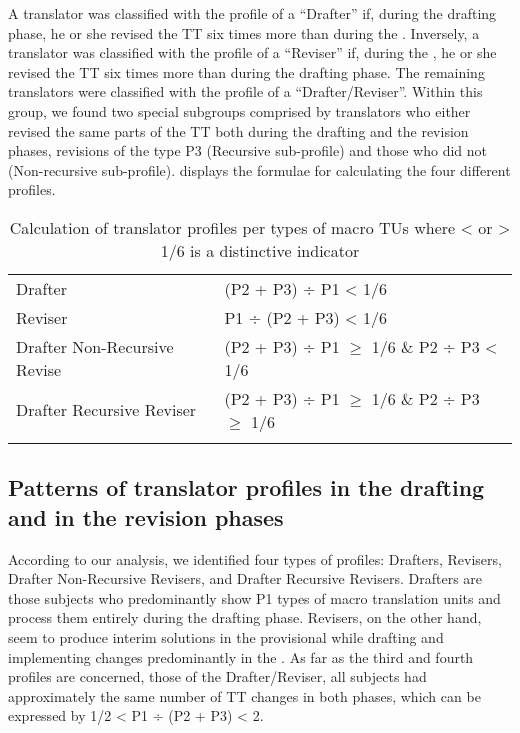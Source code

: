 \documentclass[output=paper]{LSP/langsci}
\begin{document}
A translator was classified with the profile of a ``Drafter'' if, during the drafting phase, he or she revised the TT six times more than during the . Inversely, a translator was classified with the profile of a ``Reviser'' if, during the , he or she revised the TT six times more than during the drafting phase. The remaining translators were classified with the profile of a ``Drafter/Reviser''. Within this group, we found two special subgroups comprised by translators who either revised the same parts of the TT both during the drafting and the revision phases, revisions of the type P3 (Recursive sub-profile) and those who did not (Non-recursive sub-profile).  displays the formulae for calculating the four different profiles.

\begin{table}
\begin{tabular}{ l l }
\lsptoprule
  Drafter &  (P2 + P3) ÷ P1 {\textless} 1/6 \\
  Reviser & P1 ÷ (P2 + P3) {\textless} 1/6  \\
  Drafter Non-Recursive Revise &  (P2 + P3) ÷ P1 ${\geq}$ 1/6 \& P2 ÷ P3 {\textless} 1/6  \\
  Drafter Recursive Reviser & (P2 + P3) ÷ P1 ${\geq}$ 1/6 \& P2 ÷ P3 ${\geq}$ 1/6  \\
  \lspbottomrule
\end{tabular}
\caption{Calculation of translator profiles per types of macro TUs where {\textless} or {\textgreater} 1/6 is a distinctive indicator}
\label{tab:alves:3}
\end{table}

\subsection{Patterns of translator profiles in the drafting and in the revision phases}\label{sec:alves:4.2}

According to our analysis, we identified four types of profiles: Drafters, Re\-visers, Drafter Non-Recursive Revisers, and Drafter Recursive Revisers. Drafters are those subjects who predominantly show P1 types of macro translation units and process them entirely during the drafting phase. Revisers, on the other hand, seem to produce interim solutions in the provisional  while drafting and implementing changes predominantly in the . As far as the third and fourth profiles are concerned, those of the Drafter/Reviser, all subjects had approximately the same number of TT changes in both phases, which can be expressed by 1/2 {\textless} P1 ÷ (P2 + P3) {\textless} 2.
\end{document}
